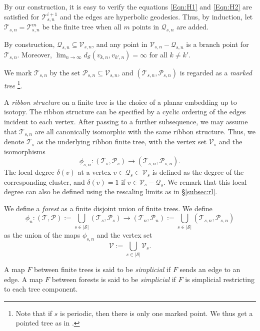 \documentclass[11pt, reqno]{amsart}
\numberwithin{equation}{section}
\theoremstyle{plain}
\theoremstyle{theorem}
\theoremstyle{definition}
\numberwithin{figure}{section}
\begin{document}
By our construction, it is easy to verify the equations \ref{Eqn:H1} and \ref{Eqn:H2} are satisfied for $\mathcal{T}^{i+1}_{s, n}$ and the edges are hyperbolic geodesics.
Thus, by induction,  let $\mathcal{T}_{s, n} = \mathcal{T}^m_{s, n}$ be the finite tree when all $m$ points in $\mathcal{Q}_{s, n}$ are added.

By construction, $\mathcal{Q}_{s, n} \subseteq \mathcal{V}_{s, n}$, and any point in $\mathcal{V}_{s, n} - \mathcal{Q}_{s, n}$ is a branch point for $\mathcal{T}_{s, n}$. 
Moreover, $\lim_{n\to\infty} d_{\mathcal{S}}(v_{k,n}, v_{k',n}) = \infty$ for all $k\neq k'$.

We mark $\mathcal{T}_{s, n}$ by the set $\mathcal{P}_{s,n} \subseteq \mathcal{V}_{s,n}$, and $(\mathcal{T}_{s, n}, \mathcal{P}_{s,n})$ is regarded as a {\em marked tree} \footnote{Note that if $s$ is periodic, then there is only one marked point. We thus get a pointed tree as in \cite{Luo21}.}.

A {\em ribbon structure} on a finite tree is the choice of a planar embedding up to isotopy. The ribbon structure can be specified by a cyclic ordering of the edges incident to each vertex.
After passing to a further subsequence, we may assume that $\mathcal{T}_{s, n}$ are all canonically isomorphic with the same ribbon structure.
Thus, we denote $\mathcal{T}_s$ as the underlying ribbon finite tree, with the vertex set $\mathcal{V}_s$ and the isomorphisms 
$$
\phi_{s, n}: (\mathcal{T}_s, \mathcal{P}_s) \longrightarrow (\mathcal{T}_{s, n}, \mathcal{P}_{s,n}).
$$
The local degree $\delta(v)$ at a vertex $v\in \mathcal{Q}_{s} \subset \mathcal{V}_s$ is defined as the degree of the corresponding cluster, and $\delta(v) = 1$ if $v \in \mathcal{V}_s - \mathcal{Q}_s$.
We remark that this local degree can also be defined using the rescaling limits as in \S \ref{subsec:rl}.

We define a {\em forest} as a finite disjoint union of finite trees.
We define
$$
\phi_{n}: (\mathcal{T}, \mathcal{P}) := \bigcup_{s\in |\mathcal{S}|} (\mathcal{T}_s, \mathcal{P}_s) \longrightarrow (\mathcal{T}_n, \mathcal{P}_n) := \bigcup_{s\in |\mathcal{S}|} (\mathcal{T}_{s, n}, \mathcal{P}_{s,n})
$$
as the union of the maps $\phi_{s,n}$ and the vertex set
$$
\mathcal{V}:= \bigcup_{s\in |\mathcal{S}|} \mathcal{V}_s.
$$

A map $F$ between finite trees is said to be {\em simplicial} if $F$ sends an edge to an edge.
A map $F$ between forests is said to be {\em simplicial} if $F$ is simplicial restricting to each tree component.
\end{document}
